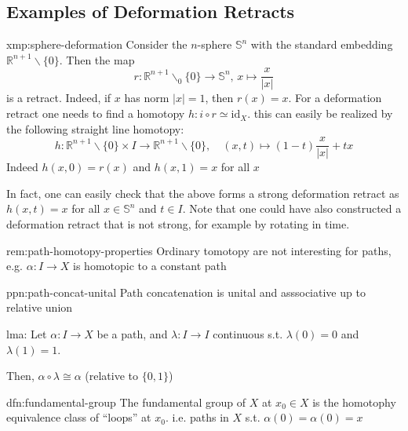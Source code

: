 \documentclass{article}
\begin{document}
\subsection{Examples of Deformation Retracts}
\begin{xmp}[Shhere]{xmp:sphere-deformation}{}
    Consider the $n$-sphere $\mathbb{S}^{n}$ with the standard embedding $\mathbb{R}^{n+1} \backslash \{ 0\}$. Then the map
    \[r : \mathbb{R}^{n+1} \backslash_{0} \{0\} \to \mathbb{S}^{n},\, x \mapsto \frac{x}{\lvert x \rvert}\]
    is a retract. Indeed, if $x$ has norm $\lvert x \rvert = 1$, then $r(x) = x$. For a deformation retract one needs to find a homotopy $h : i \circ r \simeq \mathrm{id}_{X}$. this can easily be realized by the following straight line homotopy:
    \[h : \mathbb{R}^{n+1} \backslash \{0\} \times I \to \mathbb{R}^{n+1} \backslash \{0\}, \quad (x, t) \mapsto (1-t) \frac{x}{\lvert x \rvert} + tx\]
    Indeed $h(x,0) = r(x)$ and $h(x, 1) = x$ for all $x$

    In fact, one can easily check that the above forms a strong deformation retract as $h(x, t) = x$ for all $x\in \mathbb{S}^{n}$ and $t\in I$. Note that one could have also constructed a deformation retract that is not strong, for example by rotating in time.
\end{xmp}

\newpage


\begin{rem}[]{rem:path-homotopy-properties}{}
    Ordinary tomotopy are not interesting for paths, e.g. $\alpha : I \to X$ is homotopic to a constant path
\end{rem}

\begin{ppn}[]{ppn:path-concat-unital}{}
    Path concatenation is unital and asssociative up to relative union
\end{ppn}

\begin{lma}[]{lma:}{}
    Let $\alpha : I \to X$ be a path, and $\lambda : I \to I$ continuous s.t. $\lambda(0) = 0$ and $\lambda(1) = 1$.

    Then, $\alpha \circ \lambda \cong \alpha$ (relative to $\{0,1\}$)
\end{lma}

\begin{dfn}{dfn:fundamental-group}{}
    The fundamental group of $X$ at $x_{0}\in X$ is the homotophy equivalence class of ``loops'' at $x_{0}$. i.e. paths in $X$ s.t. $\alpha(0) = \alpha(0) = x$
\end{dfn}
\end{document}
